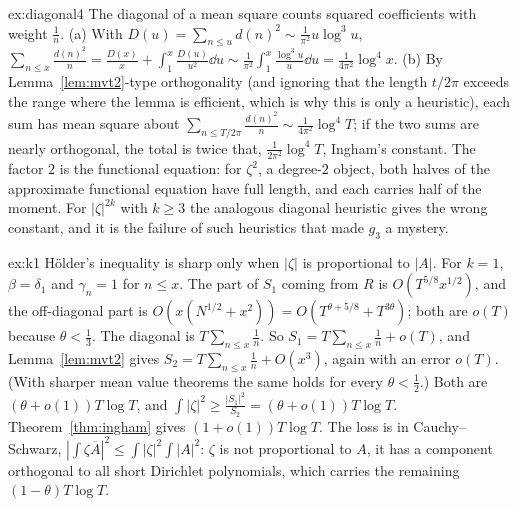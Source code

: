 \begin{solution}{ex:diagonal4}
\idea The diagonal of a mean square counts squared coefficients with weight $\frac1n$.
\writeup (a) With $D(u)=\sum_{n\le u}d(n)^2\sim\frac1{\pi^2}u\log^3u$, $\sum_{n\le x}\frac{d(n)^2}n=\frac{D(x)}x+\int_1^x\frac{D(u)}{u^2}\dd u\sim\frac1{\pi^2}\int_1^x\frac{\log^3u}u\dd u=\frac1{4\pi^2}\log^4x$. (b) By Lemma~\ref{lem:mvt2}-type orthogonality (and ignoring that the length $t/2\pi$ exceeds the range where the lemma is efficient, which is why this is only a heuristic), each sum has mean square about $\sum_{n\le T/2\pi}\frac{d(n)^2}n\sim\frac1{4\pi^2}\log^4T$; if the two sums are nearly orthogonal, the total is twice that, $\frac1{2\pi^2}\log^4T$, Ingham's constant. The factor $2$ is the functional equation: for $\zeta^2$, a degree-$2$ object, both halves of the approximate functional equation have full length, and each carries half of the moment. For $|\zeta|^{2k}$ with $k\ge3$ the analogous diagonal heuristic gives the wrong constant, and it is the failure of such heuristics that made $g_3$ a mystery.
\end{solution}

\begin{solution}{ex:k1}
\idea Hölder's inequality is sharp only when $|\zeta|$ is proportional to $|A|$.
\writeup For $k=1$, $\beta=\delta_1$ and $\gamma_n=1$ for $n\le x$. The part of $S_1$ coming from $R$ is $O(T^{5/8}x^{1/2})$, and the off-diagonal part is $O(x(N^{1/2}+x^2))=O(T^{\theta+5/8}+T^{3\theta})$; both are $o(T)$ because $\theta<\frac13$. The diagonal is $T\sum_{n\le x}\frac1n$. So $S_1=T\sum_{n\le x}\frac1n+o(T)$, and Lemma~\ref{lem:mvt2} gives $S_2=T\sum_{n\le x}\frac1n+O(x^3)$, again with an error $o(T)$. (With sharper mean value theorems the same holds for every $\theta<\frac12$.) Both are $(\theta+o(1))T\log T$, and $\int|\zeta|^2\ge\frac{|S_1|^2}{S_2}=(\theta+o(1))T\log T$. Theorem~\ref{thm:ingham} gives $(1+o(1))T\log T$. The loss is in Cauchy--Schwarz, $|\int\zeta\overline A|^2\le\int|\zeta|^2\int|A|^2$: $\zeta$ is not proportional to $A$, it has a component orthogonal to all short Dirichlet polynomials, which carries the remaining $(1-\theta)T\log T$.
\end{solution}

